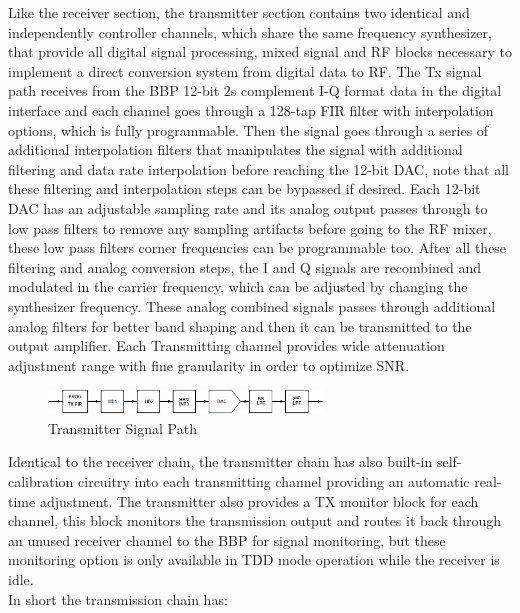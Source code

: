 Like the receiver section, the transmitter section contains two identical and
independently controller channels, which share the same frequency synthesizer,
that provide all digital signal processing, mixed signal and RF blocks necessary
to implement a direct conversion system from digital data to RF. The Tx signal
path receives from the BBP 12-bit 2s complement I-Q format data in the digital
interface and each channel goes through a 128-tap FIR filter with interpolation
options, which is fully programmable. Then the signal goes through a series of
additional interpolation filters that manipulates the signal with additional
filtering and data rate interpolation before reaching the 12-bit DAC, note that
all these filtering and interpolation steps can be bypassed if desired. Each
12-bit DAC has an adjustable sampling rate and its analog output passes through
to low pass filters to remove any sampling artifacts before going to the RF
mixer, these low pass filters corner frequencies can be programmable too. After
all these filtering and analog conversion steps, the I and Q signals are
recombined and modulated in the carrier frequency, which can be adjusted by
changing the synthesizer frequency. These analog combined signals passes through
additional analog filters for better band shaping and then it can be transmitted
to the output amplifier. Each Transmitting channel provides wide attenuation
adjustment range with fine granularity in order to optimize SNR.\\

\begin{figure}[htbp]
    \centering
    \includegraphics[width=0.65\textwidth]{./figures/tx_chain}
    \caption{ Transmitter Signal Path
    \label{fig:txchain}}
\end{figure}


Identical to the receiver chain, the transmitter chain has also built-in
self-calibration circuitry into each transmitting channel providing an automatic
real-time adjustment. The transmitter also provides a TX monitor block for each
channel, this block monitors the transmission output and routes it back through
an unused receiver channel to the BBP for signal monitoring, but these
monitoring option is only available in TDD mode operation while the receiver is
idle.\\

In short the transmission chain has:

